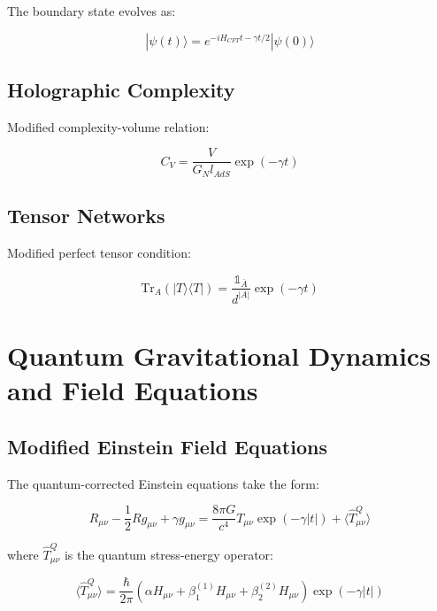 \documentclass[12pt]{article}
\theoremstyle{plain}
\theoremstyle{definition}
\theoremstyle{remark}
\begin{document}
The boundary state evolves as:

\begin{equation}
|\psi(t)\rangle = e^{-iH_{CFT}t-\gamma t/2}|\psi(0)\rangle
\end{equation}

\subsection{Holographic Complexity}

Modified complexity-volume relation:

\begin{equation}
C_V = \frac{V}{G_N l_{AdS}}\exp(-\gamma t)
\end{equation}

\subsection{Tensor Networks}

Modified perfect tensor condition:

\begin{equation}
\text{Tr}_A(|T\rangle\langle T|) = \frac{\mathbb{1}_{\bar{A}}}{d^{|A|}}\exp(-\gamma t)
\end{equation}
\section{Quantum Gravitational Dynamics and Field Equations}

\subsection{Modified Einstein Field Equations}

The quantum-corrected Einstein equations take the form:

\begin{equation}
R_{\mu\nu} - \frac{1}{2}Rg_{\mu\nu} + \gamma g_{\mu\nu} = \frac{8\pi G}{c^4}T_{\mu\nu}\exp(-\gamma|t|)
+ \langle\hat{T}_{\mu\nu}^Q\rangle
\end{equation}

where $\hat{T}_{\mu\nu}^Q$ is the quantum stress-energy operator:

\begin{equation}
\langle\hat{T}_{\mu\nu}^Q\rangle = \frac{\hbar}{2\pi}\left(\alpha H_{\mu\nu} + \beta_1 ^{(1)}H_{\mu\nu} + \beta_2 ^{(2)}H_{\mu\nu}\right)\exp(-\gamma|t|)
\end{equation}
\end{document}
